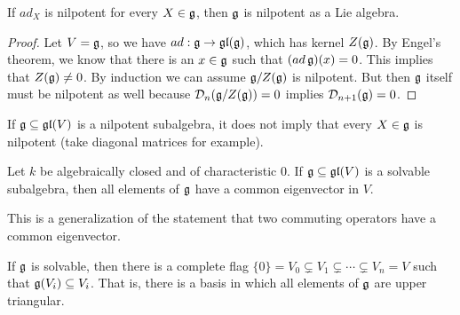  \begin{corollary}\label{lec11Engelcor2}
   If $ad_X$ is nilpotent for every $X\in \mathfrak{g}$, then $\mathfrak{g}$ is nilpotent as a Lie algebra.
 \end{corollary}
 \begin{proof}
   Let $V=\mathfrak{g}$, so we have $ad:\mathfrak{g}\to \mathfrak{gl}(\mathfrak{g})$, which has kernel $Z(\mathfrak{g})$. By Engel's
   theorem, we know that there is an $x\in\mathfrak{g}$ such that $(ad\,\mathfrak{g})(x)=0$. This implies that
   $Z(\mathfrak{g})\neq 0$. By induction we can assume $\mathfrak{g}/Z(\mathfrak{g})$ is nilpotent. But then $\mathfrak{g}$
   itself must be nilpotent as well because $\mathcal{D}_n(\mathfrak{g}/Z(\mathfrak{g}))=0$  implies
   $\mathcal{D}_{n+1}(\mathfrak{g})=0$.
 \end{proof}

 \begin{warning} If $\mathfrak{g}\subseteq \mathfrak{gl}(V)$ is a nilpotent subalgebra, it does not
 imply that every $X\in \mathfrak{g}$ is nilpotent (take diagonal matrices for example).
 \end{warning}
 \begin{theorem}\label{lec11Lie} 
   Let $k$ be algebraically closed and of characteristic 0. If $\mathfrak{g}\subseteq \mathfrak{gl}(V)$ is a
   solvable subalgebra, then all elements of $\mathfrak{g}$ have a common eigenvector in $V$.
 \end{theorem}
 This is a generalization of the statement that two commuting operators have a common
 eigenvector.
 \begin{corollary}\label{lec11Liecor}
   If $\mathfrak{g}$ is solvable, then there is a complete flag
 $\{0\}=V_0\varsubsetneq V_1\varsubsetneq \cdots \varsubsetneq V_n=V$
 such that $\mathfrak{g}(V_i)\subseteq V_i$. That is, there is a basis in which all elements of
 $\mathfrak{g}$ are upper triangular.
 \end{corollary}
